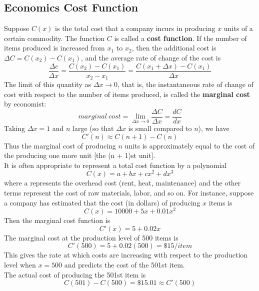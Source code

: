 \subsection{Economics Cost Function}
Suppose $C(x)$ is the total cost that a company incurs in producing $x$ units of a certain commodity. The function $C$ is called a \textbf{cost function}. If the number of items produced is increased from $x_1$ to $x_2$, then the additional cost is $\Delta C=C(x_2) - C(x_1)$, and the average rate of change of the cost is 
$$
    \frac{\Delta c}{\Delta x}=\frac{C(x_2) - C(x_1)}{x_2 - x_1} = \frac{C(x_1 + \Delta x) - C(x_1)}{\Delta x}
$$
The limit of this quantity as $\Delta x \rightarrow 0$, that is, the instantaneous rate of change of cost with respect to the number of items produced, is called the \textbf{marginal cost} by economist:
$$
    marginal\ cost = \lim_{\Delta x \to 0} \frac{\Delta C}{\Delta x} = \frac{dC}{dx}
$$
Taking $\Delta x = 1$ and $n$ large (so that $\Delta x$ is small compared to $n$), we have
$$
    C'(n) \approx C(n+1) - C(n)
$$
Thus the marginal cost of producing $n$ units is approximately equal to the cost of the producing one more unit [the (n + 1)st unit].\\
It is often appropriate to represent a total cost function by a polynomial
$$
    C(x) = a + bx + cx^2 + dx^3
$$
where a represents the overhead cost (rent, heat, maintenance) and the other terms represent the cost of raw materials, labor, and so on.
For instance, suppose a company has estimated that the cost (in dollars) of producing $x$ items is
$$
    C(x) = 10000 + 5x + 0.01x^2
$$
Then the marginal cost function is
$$
    C'(x) = 5 + 0.02x
$$
The marginal cost at the production level of 500 items is
$$
    C'(500) = 5 + 0.02(500) = \$15/item
$$
This gives the rate at which costs are increasing with respect to the production level when $x=500$ and predicts the cost of the 501st item.\\
The actual cost of producing the 501st item is
$$
    C(501) - C(500) = \$15.01 \approx C'(500)
$$

